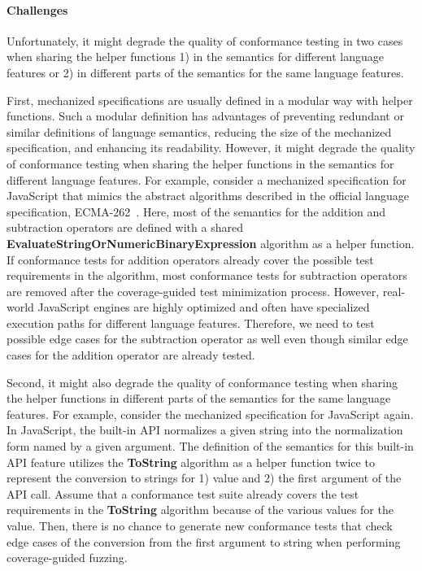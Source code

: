 
\paragraph{\textbf{Challenges}}
%
Unfortunately, it might degrade the quality of conformance testing in two cases
when sharing the helper functions 1) in the semantics for different language
features or 2) in different parts of the semantics for the same language
features.


First, mechanized specifications are usually defined in a modular way with
helper functions.
%
Such a modular definition has advantages of preventing redundant or similar
definitions of language semantics, reducing the size of the mechanized
specification, and enhancing its readability.
%
However, it might degrade the quality of conformance testing when sharing the
helper functions in the semantics for different language features.
%
For example, consider a mechanized specification for JavaScript that mimics the
abstract algorithms described in the official language specification,
ECMA-262~\cite{es13}.
%
Here, most of the semantics for the addition and subtraction operators are
defined with a shared \textbf{EvaluateStringOrNumericBinaryExpression} algorithm
as a helper function.
%
If conformance tests for addition operators already cover the possible test
requirements in the algorithm, most conformance tests for subtraction operators
are removed after the coverage-guided test minimization process.
%
However, real-world JavaScript engines are highly optimized and often have
specialized execution paths for different language features.
%
Therefore, we need to test possible edge cases for the subtraction operator as
well even though similar edge cases for the addition operator are already
tested.


Second, it might also degrade the quality of conformance testing when sharing
the helper functions in different parts of the semantics for the same language
features.
%
For example, consider the mechanized specification for JavaScript again.
%
In JavaScript, the  built-in API normalizes a
given string into the normalization form named by a given argument.
%
The definition of the semantics for this built-in API feature utilizes the
\textbf{ToString} algorithm as a helper function twice to represent the
conversion to strings for 1)  value and 2) the first argument of
the API call.
%
Assume that a conformance test suite already covers the test requirements in the
\textbf{ToString} algorithm because of the various values for the 
value.
%
Then, there is no chance to generate new conformance tests that check edge cases
of the conversion from the first argument to string when performing
coverage-guided fuzzing.

